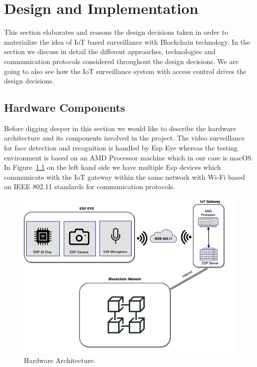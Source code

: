 \chapter{Design and Implementation}
\label{chap:cran_for_lora}

This section elaborates and reasons the design decisions taken in order to materialize the idea of IoT based surveillance with Blockchain technology. In the section we discuss in detail the different approaches, technologies and communication protocols considered throughout the design decisions. We are going to also see how the IoT surveillance system with access control drives the design decisions. 





\section{Hardware Components}

Before digging deeper in this section we would like to describe the hardware architecture and its components involved in the project.
The video surveillance for face detection and recognition is handled by Esp Eye whereas the testing environment is based on an AMD Processor machine which in our case is macOS.
In Figure~\ref{fig:hardarchitecture} on the left hand side we have multiple Esp devices which communicate with the IoT gateway within the same network with Wi-Fi based on IEEE 802.11 standards for communication protocols. 

\begin{figure}[!htb]
    \centering
    \includegraphics[width=1\textwidth]{figures/surveillance1copy.png}
    \caption{Hardware Architecture.}
    \label{fig:hardarchitecture}
\end{figure}


